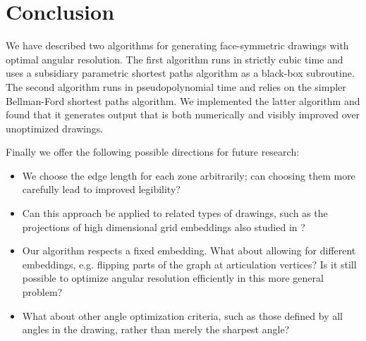 \documentclass[11pt,letter]{article}
\begin{document}
\section{Conclusion}

We have described two algorithms for generating face-symmetric drawings with optimal angular resolution.  The first algorithm runs in strictly cubic time and uses a subsidiary parametric shortest paths algorithm as a black-box subroutine.  The second algorithm runs in pseudopolynomial time and relies on the simpler Bellman-Ford shortest paths algorithm.  We implemented the latter algorithm and found that it generates output that is both numerically and visibly improved over unoptimized drawings.

Finally we offer the following possible directions for future research:
\begin{itemize}
\item We choose the edge length for each zone arbitrarily; can choosing them more carefully lead to improved legibility?
\item Can this approach be applied to related types of drawings, such as the projections of high dimensional grid embeddings also studied in \cite{Epp-GD-04}?
\item Our algorithm respects a fixed embedding.  What about allowing for different embeddings, e.g. flipping parts of the graph at articulation vertices?  Is it still possible to optimize angular resolution efficiently in this more general problem?
\item What about other angle optimization criteria, such as those defined by all angles in the drawing, rather than merely the sharpest angle?
\end{itemize}



\end{document}
